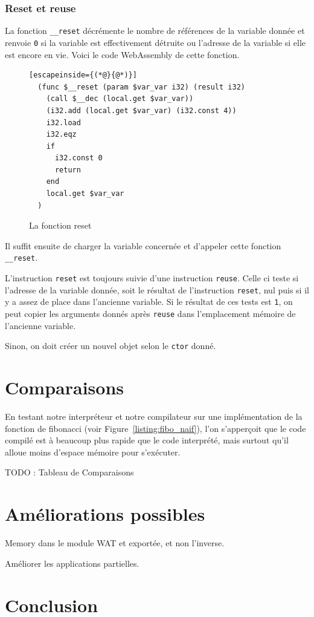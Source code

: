 \documentclass{rapportECL}
\begin{document}
\subsubsection{Reset et reuse}

La fonction \verb|__reset| décrémente le nombre de références de la variable donnée et renvoie \verb|0| si la variable est 
effectivement détruite ou l'adresse de la variable si elle est encore en vie. Voici le code WebAssembly de cette fonction.

\begin{figure}[H]
	\begin{lstlisting}[escapeinside={(*@}{@*)}]
  (func $__reset (param $var_var i32) (result i32)
    (call $__dec (local.get $var_var))
    (i32.add (local.get $var_var) (i32.const 4))
    i32.load
    i32.eqz
    if
      i32.const 0
      return
    end
    local.get $var_var
  )
	\end{lstlisting}
	\caption{La fonction reset}
	\label{listing:compile_reset}
\end{figure}

Il suffit ensuite de charger la variable concernée et d'appeler cette fonction \verb|__reset|.

\medskip

L'instruction \verb|reset| est toujours suivie d'une instruction \verb|reuse|. Celle ci teste si l'adresse de la variable donnée, 
soit le résultat de l'instruction \verb|reset|, nul puis si il y a assez de place dans l'ancienne variable. Si le résultat de ces
tests est \verb|1|, on peut copier les arguments donnés après \verb|reuse| dans l'emplacement mémoire de l'ancienne variable.

Sinon, on doit créer un nouvel objet selon le \verb|ctor| donné.

\section{Comparaisons}

En testant notre interpréteur et notre compilateur sur une implémentation de la fonction de fibonacci 
(voir Figure~\ref{listing:fibo_naif}), l'on s'apperçoit que le code compilé est à beaucoup plus rapide que le code interprété,
mais surtout qu'il alloue moins d'espace mémoire pour s'exécuter.

TODO : Tableau de Comparaisons

\section{Améliorations possibles}

Memory dans le module WAT et exportée, et non l'inverse.

Améliorer les applications partielles.


\section{Conclusion}

\printbibliography
\end{document}
